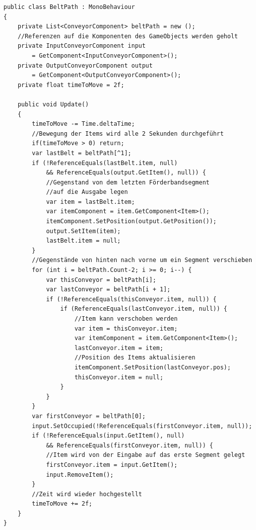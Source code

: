 \begin{lstlisting}[style=code, caption={[Förderband Komponente im objektorientierten Ansatz]Förderband Komponente im objektorientierten Ansatz. Es speichert die Ein- und Ausgabe des Förderbandes und alle Segmente die zu dem Förderband gehören. Das Förderband sorgt dafür, dass alle Items entlang des Förderbandes weiterbewegt werden.}, label=lstConveyorKomponente]
public class BeltPath : MonoBehaviour
{
    private List<ConveyorComponent> beltPath = new ();
    //Referenzen auf die Komponenten des GameObjects werden geholt
    private InputConveyorComponent input 
        = GetComponent<InputConveyorComponent>();
    private OutputConveyorComponent output 
        = GetComponent<OutputConveyorComponent>();
    private float timeToMove = 2f;

    public void Update()
    {
        timeToMove -= Time.deltaTime;
        //Bewegung der Items wird alle 2 Sekunden durchgeführt
        if(timeToMove > 0) return;
        var lastBelt = beltPath[^1];
        if (!ReferenceEquals(lastBelt.item, null)
            && ReferenceEquals(output.GetItem(), null)) {
            //Gegenstand von dem letzten Förderbandsegment
            //auf die Ausgabe legen
            var item = lastBelt.item;
            var itemComponent = item.GetComponent<Item>();
            itemComponent.SetPosition(output.GetPosition());
            output.SetItem(item);
            lastBelt.item = null;
        }
        //Gegenstände von hinten nach vorne um ein Segment verschieben
        for (int i = beltPath.Count-2; i >= 0; i--) {
            var thisConveyor = beltPath[i];
            var lastConveyor = beltPath[i + 1];
            if (!ReferenceEquals(thisConveyor.item, null)) {
                if (ReferenceEquals(lastConveyor.item, null)) {
                    //Item kann verschoben werden
                    var item = thisConveyor.item;
                    var itemComponent = item.GetComponent<Item>();
                    lastConveyor.item = item;
                    //Position des Items aktualisieren
                    itemComponent.SetPosition(lastConveyor.pos);
                    thisConveyor.item = null;
                }
            }
        }
        var firstConveyor = beltPath[0];
        input.SetOccupied(!ReferenceEquals(firstConveyor.item, null));
        if (!ReferenceEquals(input.GetItem(), null)
            && ReferenceEquals(firstConveyor.item, null)) {
            //Item wird von der Eingabe auf das erste Segment gelegt
            firstConveyor.item = input.GetItem();
            input.RemoveItem();
        }
        //Zeit wird wieder hochgestellt
        timeToMove += 2f;
    }
}
\end{lstlisting}
